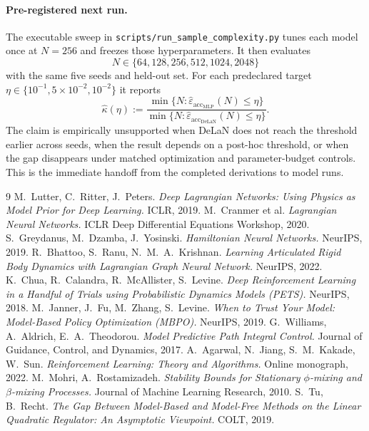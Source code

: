 \documentclass[11pt]{article}
\newcommand{\epsacc}{\varepsilon_{\mathrm{acc}}}
\begin{document}
\paragraph{Pre-registered next run.}
The executable sweep in \texttt{scripts/run\_sample\_complexity.py} tunes each
model once at $N=256$ and freezes those hyperparameters. It then evaluates
\[
  N\in\{64,128,256,512,1024,2048\}
\]
with the same five seeds and held-out set.
For each predeclared target $\eta\in\{10^{-1},5\!\times\!10^{-2},10^{-2}\}$ it
reports
\[
  \hat\kappa(\eta)
  :=\frac{\min\{N:\widehat\epsacc_{\mathrm{MLP}}(N)\le\eta\}}
  {\min\{N:\widehat\epsacc_{\mathrm{DeLaN}}(N)\le\eta\}}.
\]
The claim is empirically unsupported when DeLaN does not reach the threshold
earlier across seeds, when the result depends on a post-hoc threshold, or when
the gap disappears under matched optimization and parameter-budget controls.
This is the immediate handoff from the completed derivations to model runs.

\begin{thebibliography}{9}
 M.~Lutter, C.~Ritter, J.~Peters.
  \emph{Deep Lagrangian Networks: Using Physics as Model Prior for Deep
  Learning.} ICLR, 2019.
 M.~Cranmer et al.
  \emph{Lagrangian Neural Networks.} ICLR Deep Differential Equations
  Workshop, 2020.
 S.~Greydanus, M.~Dzamba, J.~Yosinski.
  \emph{Hamiltonian Neural Networks.} NeurIPS, 2019.
 R.~Bhattoo, S.~Ranu, N.~M.~A.~Krishnan.
  \emph{Learning Articulated Rigid Body Dynamics with Lagrangian Graph Neural
  Network.} NeurIPS, 2022.
 K.~Chua, R.~Calandra, R.~McAllister, S.~Levine.
  \emph{Deep Reinforcement Learning in a Handful of Trials using Probabilistic
  Dynamics Models (PETS).} NeurIPS, 2018.
 M.~Janner, J.~Fu, M.~Zhang, S.~Levine.
  \emph{When to Trust Your Model: Model-Based Policy Optimization (MBPO).}
  NeurIPS, 2019.
 G.~Williams, A.~Aldrich, E.~A.~Theodorou.
  \emph{Model Predictive Path Integral Control.} Journal of Guidance, Control,
  and Dynamics, 2017.
 A.~Agarwal, N.~Jiang, S.~M.~Kakade, W.~Sun.
  \emph{Reinforcement Learning: Theory and Algorithms.} Online monograph, 2022.
 M.~Mohri, A.~Rostamizadeh.
  \emph{Stability Bounds for Stationary $\phi$-mixing and $\beta$-mixing
  Processes.} Journal of Machine Learning Research, 2010.
 S.~Tu, B.~Recht.
  \emph{The Gap Between Model-Based and Model-Free Methods on the Linear
  Quadratic Regulator: An Asymptotic Viewpoint.} COLT, 2019.
\end{thebibliography}
\end{document}
